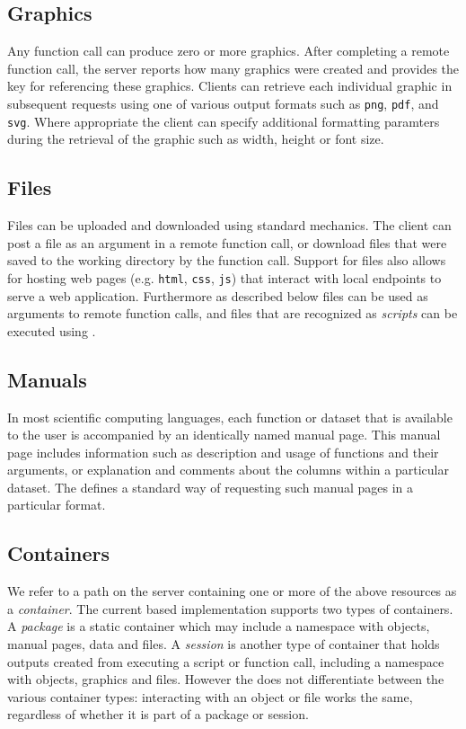 \subsection{Graphics}

Any function call can produce zero or more graphics. After completing a remote function call, the server reports how many graphics were created and provides the key for referencing these graphics. Clients can retrieve each individual graphic in subsequent requests using one of various output formats such as \texttt{png}, \texttt{pdf}, and \texttt{svg}. Where appropriate the client can specify additional formatting paramters during the retrieval of the graphic such as width, height or font size.

\subsection{Files}

Files can be uploaded and downloaded using standard \HTTP mechanics. The client can post a file as an argument in a remote function call, or download files that were saved to the working directory by the function call. Support for files also allows for hosting web pages (e.g. \texttt{html}, \texttt{css}, \texttt{js}) that interact with local \API endpoints to serve a web application. Furthermore as described below files can be used as arguments to remote function calls, and files that are recognized as \emph{scripts} can be executed using \RPC.

\subsection{Manuals}

In most scientific computing languages, each function or dataset that is available to the user is accompanied by an identically named manual page. This manual page includes information such as description and usage of functions and their arguments, or explanation and comments about the columns within a particular dataset. The \API defines a standard way of requesting such manual pages in a particular format.

\subsection{Containers}
 
We refer to a path on the server containing one or more of the above resources as a \emph{container}. The current \R based \OpenCPU implementation supports two types of containers. A \emph{package} is a static container which may include a namespace with objects, manual pages, data and files. A \emph{session} is another type of container that holds outputs created from executing a script or function call, including a namespace with objects, graphics and files. However the \API does not differentiate between the various container types: interacting with an object or file works the same, regardless of whether it is part of a package or session.

